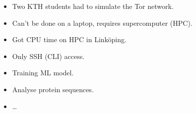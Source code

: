 \begin{frame}
  \begin{example}[Supercomputing]
    \begin{itemize}
      \item Two KTH students had to simulate the Tor network.
      \item Can't be done on a laptop, requires supercomputer (HPC).
      \item Got CPU time on HPC in Linköping.
      \item Only SSH (CLI) access.
    \end{itemize}
  \end{example}

  \pause

  \begin{example}
    \begin{itemize}
      \item Training ML model.
      \item Analyse protein sequences.
      \item \dots
    \end{itemize}
  \end{example}
\end{frame}
